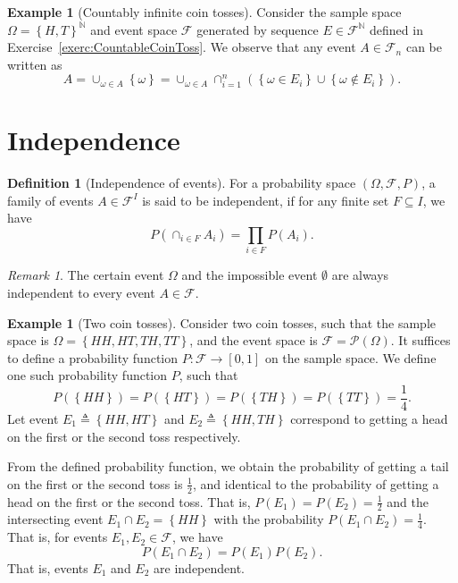 \documentclass[letterpaper,10pt,english]{article}
\theoremstyle{plain}
\theoremstyle{definition}
\newtheorem{defn}[thm]{Definition}
\newtheorem{exmp}[thm]{Example}
\theoremstyle{remark}
\newtheorem{rem}{Remark}
\newcommand{\EQ}[1]{\begin{equation*}#1\end{equation*}}
\newcommand{\set}[1]{\left\{#1\right\}}
\newcommand{\N}{\mathbb{N}}
\newcommand{\cP}{\mathcal{P}}
\newcommand{\sF}{\mathscr{F}}
\begin{document}
\begin{shaded}
\begin{exmp}[Countably infinite coin tosses] 
Consider the sample space $\Omega = \set{H,T}^\N$ and event space $\sF$ generated by sequence $E \in \sF^\N$ defined in Exercise~\ref{exerc:CountableCoinToss}. 
We observe that any event $A \in \sF_n$ can be written as 
\begin{equation*}
A = \cup_{\omega \in A}\set{\omega} 
= \cup_{\omega \in A}\cap_{i=1}^n(\set{\omega \in E_i}\cup\set{\omega \notin E_i}).
\end{equation*}  
\end{exmp}
\end{shaded}

\section{Independence}
\begin{defn}[Independence of events] 
For a probability space $(\Omega, \sF, P)$, a family of events $A \in \sF^I$ is said to be independent, 
if for any finite set $F \subseteq I$, we have 
\EQ{
P(\cap_{i \in F}A_i) = \prod_{i \in F}P(A_i). 
}
\end{defn}
\begin{rem} 
The certain event $\Omega$ and the impossible event $\emptyset$ are always independent to every event $A \in \sF$. 
\end{rem}
\begin{shaded}
\begin{exmp}[Two coin tosses] 
Consider two coin tosses, such that the sample space is $\Omega = \set{HH, HT, TH, TT}$, 
and the event space is $\sF = \cP(\Omega)$. 
It suffices to define a probability function $P: \sF \to [0,1]$ on the sample space. 
We define one such probability function $P$, such that 
\EQ{
P(\set{HH}) = P(\set{HT}) = P(\set{TH}) =P(\set{TT}) = \frac{1}{4}. 
}
Let event $E_1 \triangleq \set{HH, HT}$ and $E_2 \triangleq \set{HH, TH}$ correspond to getting a head on the first or the second toss respectively. 

From the defined probability function, we obtain the probability of getting a tail on the first or the second toss is $\frac{1}{2}$, 
and identical to the probability of getting a head on the first or the second toss. 
That is, $P(E_1) = P(E_2) = \frac{1}{2}$ and the intersecting event $E_1\cap E_2 = \set{HH}$ with the probability $P(E_1 \cap E_2) = \frac{1}{4}$. 
That is, for events $E_1, E_2 \in \sF$, we have 
\EQ{
P(E_1 \cap E_2) = P(E_1)P(E_2).
}
That is, events $E_1$ and $E_2$ are independent. 
\end{exmp}
\end{shaded}
\end{document}
